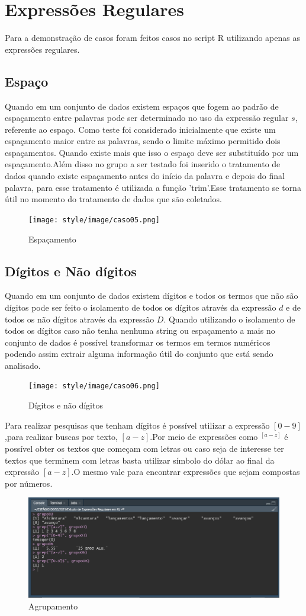 \documentclass[a4paper]{article}
\begin{document}
\section{Expressões Regulares}
Para a demonstração de casos foram feitos casos no script R utilizando apenas as expressões regulares.

\subsection{Espaço}
Quando em um conjunto de dados existem espaços que fogem ao padrão de espaçamento entre palavras pode ser determinado no uso da expressão regular $s$, referente ao espaço. Como teste foi considerado inicialmente que existe um espaçamento maior entre as palavras, sendo o limite máximo permitido dois espaçamentos. Quando existe mais que isso o espaço deve ser substituído por um espaçamento.Além disso no grupo a ser testado foi inserido o tratamento de dados quando existe espaçamento antes do início da palavra e depois do final palavra, para esse tratamento é utilizada a função 'trim'.Esse tratamento se torna útil no momento do tratamento de dados que são coletados.
\begin{figure}[htb!]
    \centering
    \texttt{[image: style/image/caso05.png]}
    \caption{Espaçamento}
    \label{fig:S}
\end{figure}
\subsection{Dígitos e Não dígitos}
Quando em um conjunto de dados existem dígitos e todos os termos que não são dígitos pode ser feito o isolamento de todos os dígitos através da expressão $d$ e de todos os não dígitos através da expressão $D$. Quando utilizando o isolamento de todos os dígitos caso não tenha nenhuma string ou espaçamento a mais no conjunto de dados é possível transformar os termos em termos numéricos podendo assim extrair alguma informação útil do conjunto que está sendo analisado.
\begin{figure}[htb!]
    \centering
    \texttt{[image: style/image/caso06.png]}
    \caption{Dígitos e não dígitos}
    \label{fig:dígitos}
\end{figure}
Para realizar pesquisas que tenham dígitos é possível utilizar a expressão $[0-9]$,para realizar buscas por texto, $[a-z]$.Por meio de expressões como $^[a-z]$ é possível obter os textos que começam com letras ou caso seja de interesse ter textos que terminem com letras basta utilizar símbolo do dólar ao final da expressão $[a-z]$.O mesmo vale para encontrar expressões que sejam compostas por números.
\begin{figure}[htb!]
    \centering
    \includegraphics[width=0.7\linewidth]{style/image/caso09.png}
    \caption{Agrupamento}
    \label{fig:grep01}
\end{figure}
\end{document}
